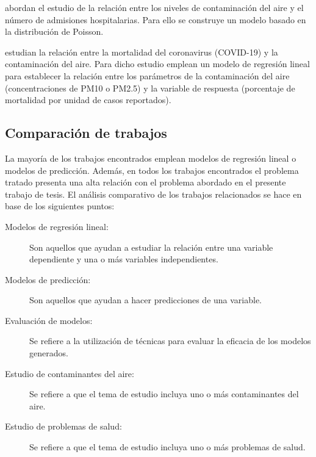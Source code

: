\documentclass[3p,times]{elsarticle}
\begin{document}
\citet{r19} abordan el estudio de la relación entre los niveles de contaminación del aire y el número de admisiones hospitalarias. Para ello se construye un modelo basado en la distribución de Poisson.

\citet{r20} estudian la relación entre la mortalidad del coronavirus (COVID-19) y la contaminación del aire. Para dicho estudio emplean un modelo de regresión lineal para establecer la relación entre los parámetros de la contaminación del aire (concentraciones de PM10 o PM2.5) y la variable de respuesta (porcentaje de mortalidad por unidad de casos reportados).

\subsection{Comparación de trabajos}
La mayoría de los trabajos encontrados emplean modelos de regresión lineal o modelos de predicción. Además, en todos los trabajos encontrados el problema tratado presenta una alta relación con el problema abordado en el presente trabajo de tesis. El análisis comparativo de los trabajos relacionados se hace en base de los siguientes puntos:

\begin{description}
\item[Modelos de regresión lineal:]{Son aquellos que ayudan a estudiar la relación entre una variable dependiente y una o más variables independientes.}
\end{description}

\begin{description}
\item[Modelos de predicción:]{Son aquellos que ayudan a hacer predicciones de una variable.}
\end{description}

\begin{description}
\item[Evaluación de modelos:]{Se refiere a la utilización de técnicas para evaluar la eficacia de los modelos generados.}
\end{description}

\begin{description}
\item[Estudio de contaminantes del aire:]{Se refiere a que el tema de estudio incluya uno o más contaminantes del aire.}
\end{description}

\begin{description}
\item[Estudio de problemas de salud:]{Se refiere a que el tema de estudio incluya uno o más problemas de salud.}
\end{description}
\end{document}
